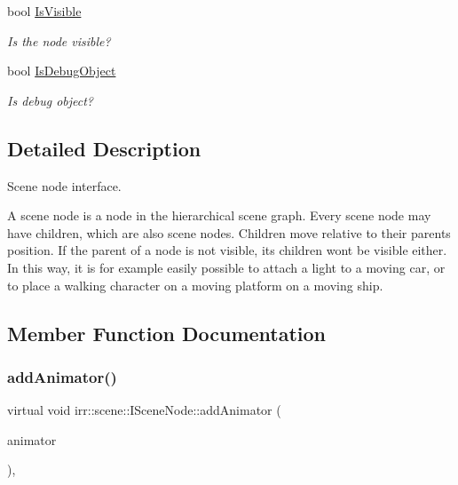 \begin{DoxyCompactItemize}
\mbox{\label{classirr_1_1scene_1_1ISceneNode_aa834128c57215457914ef46d9b18cc5e}} 
bool \hyperlink{classirr_1_1scene_1_1ISceneNode_aa834128c57215457914ef46d9b18cc5e}{Is\+Visible}
\begin{DoxyCompactList}\small\item\em Is the node visible? \end{DoxyCompactList}\item 
\mbox{\label{classirr_1_1scene_1_1ISceneNode_a8f1ba7c5e77eecc2adc6d12df0d27dd6}} 
bool \hyperlink{classirr_1_1scene_1_1ISceneNode_a8f1ba7c5e77eecc2adc6d12df0d27dd6}{Is\+Debug\+Object}
\begin{DoxyCompactList}\small\item\em Is debug object? \end{DoxyCompactList}\end{DoxyCompactItemize}


\subsection{Detailed Description}
Scene node interface. 

A scene node is a node in the hierarchical scene graph. Every scene node may have children, which are also scene nodes. Children move relative to their parent\textquotesingle{}s position. If the parent of a node is not visible, its children won\textquotesingle{}t be visible either. In this way, it is for example easily possible to attach a light to a moving car, or to place a walking character on a moving platform on a moving ship. 

\subsection{Member Function Documentation}
\mbox{\label{classirr_1_1scene_1_1ISceneNode_a0e5cd342cd7293c136e53e2c2c5e0f3a}} 
\subsubsection{\texorpdfstring{add\+Animator()}{addAnimator()}\hspace{0.1cm}{\footnotesize\ttfamily [1/2]}}
{\footnotesize\ttfamily virtual void irr\+::scene\+::\+I\+Scene\+Node\+::add\+Animator (\begin{DoxyParamCaption}\item[{\hyperlink{classirr_1_1scene_1_1ISceneNodeAnimator}{I\+Scene\+Node\+Animator} $\ast$}]{animator }\end{DoxyParamCaption})\hspace{0.3cm}{\ttfamily [inline]}, {\ttfamily [virtual]}}



